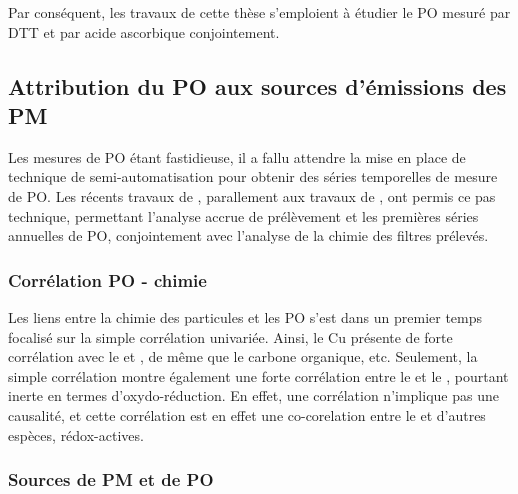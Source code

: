 Par conséquent, les travaux de cette thèse s'emploient à étudier le PO mesuré par DTT et
par acide ascorbique conjointement.

\subsection{Attribution du PO aux sources d'émissions des PM}%
\label{sub:attribution_du_po_aux_sources_d_émissions_des_pm}

Les mesures de PO étant fastidieuse, il a fallu attendre la mise en place de technique
de semi-automatisation pour obtenir des séries temporelles de mesure de PO. Les récents
travaux de \textcite{fangSemiautomated2015}, parallement aux travaux de
\textcite{calasPollution2017}, ont permis ce pas technique, permettant l'analyse accrue de
prélèvement et les premières séries annuelles de PO, conjointement avec l'analyse de la
chimie des filtres prélevés.

\subsubsection{Corrélation PO - chimie}%
\label{ssub:corrélation_po_chimie}

Les liens entre la chimie des particules et les PO s'est dans un premier temps focalisé
sur la simple corrélation univariée. Ainsi, le Cu présente de forte corrélation
avec le \PODTT{} et \POAA, de même que le carbone organique, etc. Seulement, la simple
corrélation montre également une forte corrélation entre le \PODTT{} et le ,
pourtant inerte en termes d'oxydo-réduction.
En effet, une corrélation n'implique pas une causalité, et cette corrélation est en effet
une co-corelation entre le  et d'autres espèces, rédox-actives.



\subsubsection{Sources de PM et de PO}%
\label{ssub:sources_de_pm_et_de_po}


